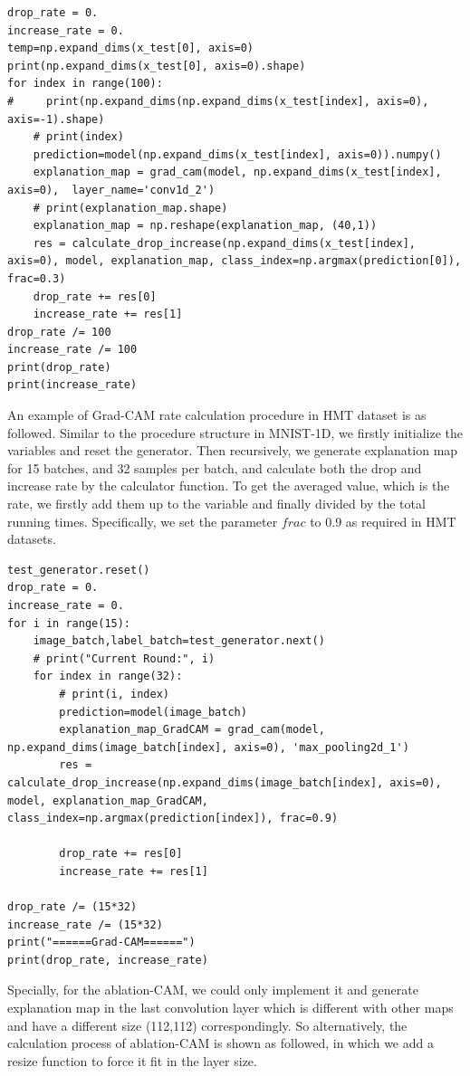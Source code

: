 \documentclass[conference]{IEEEtran}
\begin{document}
\begin{lstlisting}
drop_rate = 0.
increase_rate = 0.
temp=np.expand_dims(x_test[0], axis=0)
print(np.expand_dims(x_test[0], axis=0).shape)
for index in range(100):
#     print(np.expand_dims(np.expand_dims(x_test[index], axis=0), axis=-1).shape)
    # print(index)
    prediction=model(np.expand_dims(x_test[index], axis=0)).numpy()
    explanation_map = grad_cam(model, np.expand_dims(x_test[index], axis=0),  layer_name='conv1d_2')
    # print(explanation_map.shape)
    explanation_map = np.reshape(explanation_map, (40,1))
    res = calculate_drop_increase(np.expand_dims(x_test[index], axis=0), model, explanation_map, class_index=np.argmax(prediction[0]), frac=0.3)
    drop_rate += res[0]
    increase_rate += res[1]
drop_rate /= 100
increase_rate /= 100
print(drop_rate)
print(increase_rate)
\end{lstlisting}

An example of Grad-CAM rate calculation procedure in HMT dataset is as followed. Similar to the procedure structure in MNIST-1D, we firstly initialize the variables and reset the generator. Then recursively, we generate explanation map for 15 batches, and 32 samples per batch, and calculate both the drop and increase rate by the calculator function. To get the averaged value, which is the rate, we firstly add them up to the variable and finally divided by the total running times. Specifically, we set the parameter $frac$ to 0.9 as required in HMT datasets.

\begin{lstlisting}
test_generator.reset()
drop_rate = 0.
increase_rate = 0.
for i in range(15):
    image_batch,label_batch=test_generator.next()
    # print("Current Round:", i)
    for index in range(32):
        # print(i, index)
        prediction=model(image_batch)
        explanation_map_GradCAM = grad_cam(model, np.expand_dims(image_batch[index], axis=0), 'max_pooling2d_1')
        res = calculate_drop_increase(np.expand_dims(image_batch[index], axis=0), model, explanation_map_GradCAM, class_index=np.argmax(prediction[index]), frac=0.9)

        drop_rate += res[0]
        increase_rate += res[1]

drop_rate /= (15*32)
increase_rate /= (15*32)
print("======Grad-CAM======")
print(drop_rate, increase_rate)
\end{lstlisting}

Specially, for the ablation-CAM, we could only implement it and generate explanation map in the last convolution layer which is different with other maps and have a different size (112,112) correspondingly. So alternatively, the calculation process of ablation-CAM is shown as followed, in which we add a resize function to force it fit in the layer size.
\end{document}

